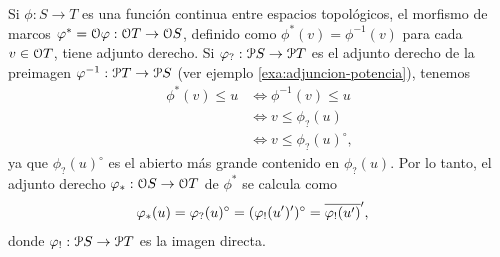 \begin{example}%
  \label{exa:adjunto-derecho-top}
  Si $\phi:S\to T$ es una función continua entre espacios
  topológicos, el morfismo de marcos
  $\phi^*=\cal O\phi:\cal OT\to\cal OS$,
  definido como $\phi^*(v)=\phi^{-1}(v)$ para cada $v\in\cal OT$,
  tiene adjunto derecho.
  Si $\phi_?:\cal PS\to\cal PT$ es el adjunto derecho de la
  preimagen $\phi^{-1}:\cal PT\to\cal PS$ (ver ejemplo
  \ref{exa:adjuncion-potencia}), tenemos
  \begin{align*}
    \phi^*(v) \leq u
    &\iff \phi^{-1}(v) \leq u \\
    &\iff v \leq \phi_?(u) \\
    &\iff v\leq \phi_?(u)^\circ,
  \end{align*}
  ya que $\phi_?(u)^\circ$ es el abierto más grande contenido en
  $\phi_?(u)$.
  Por lo tanto, el adjunto derecho $\phi_*:\cal OS\to\cal OT$ de
  $\phi^*$ se calcula como
  \begin{align*}
    \phi_*(u) &= \phi_?(u)^\circ = (\phi_!(u')')^\circ = \ol{\phi_!(u')}',
  \end{align*}
  donde $\phi_!:\cal PS\to\cal PT$ es la imagen directa.
\end{example}

